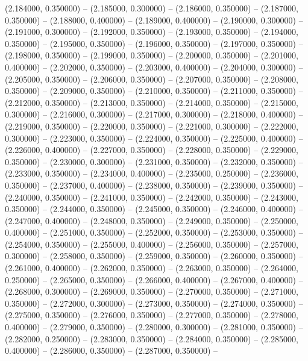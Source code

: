 (2.184000, 0.350000) -- 
(2.185000, 0.300000) -- 
(2.186000, 0.350000) -- 
(2.187000, 0.350000) -- 
(2.188000, 0.400000) -- 
(2.189000, 0.400000) -- 
(2.190000, 0.300000) -- 
(2.191000, 0.300000) -- 
(2.192000, 0.350000) -- 
(2.193000, 0.350000) -- 
(2.194000, 0.350000) -- 
(2.195000, 0.350000) -- 
(2.196000, 0.350000) -- 
(2.197000, 0.350000) -- 
(2.198000, 0.350000) -- 
(2.199000, 0.350000) -- 
(2.200000, 0.350000) -- 
(2.201000, 0.400000) -- 
(2.202000, 0.350000) -- 
(2.203000, 0.400000) -- 
(2.204000, 0.300000) -- 
(2.205000, 0.350000) -- 
(2.206000, 0.350000) -- 
(2.207000, 0.350000) -- 
(2.208000, 0.350000) -- 
(2.209000, 0.350000) -- 
(2.210000, 0.350000) -- 
(2.211000, 0.350000) -- 
(2.212000, 0.350000) -- 
(2.213000, 0.350000) -- 
(2.214000, 0.350000) -- 
(2.215000, 0.300000) -- 
(2.216000, 0.300000) -- 
(2.217000, 0.300000) -- 
(2.218000, 0.400000) -- 
(2.219000, 0.350000) -- 
(2.220000, 0.350000) -- 
(2.221000, 0.300000) -- 
(2.222000, 0.300000) -- 
(2.223000, 0.350000) -- 
(2.224000, 0.350000) -- 
(2.225000, 0.400000) -- 
(2.226000, 0.400000) -- 
(2.227000, 0.350000) -- 
(2.228000, 0.350000) -- 
(2.229000, 0.350000) -- 
(2.230000, 0.300000) -- 
(2.231000, 0.350000) -- 
(2.232000, 0.350000) -- 
(2.233000, 0.350000) -- 
(2.234000, 0.400000) -- 
(2.235000, 0.250000) -- 
(2.236000, 0.350000) -- 
(2.237000, 0.400000) -- 
(2.238000, 0.350000) -- 
(2.239000, 0.350000) -- 
(2.240000, 0.350000) -- 
(2.241000, 0.350000) -- 
(2.242000, 0.350000) -- 
(2.243000, 0.350000) -- 
(2.244000, 0.350000) -- 
(2.245000, 0.350000) -- 
(2.246000, 0.400000) -- 
(2.247000, 0.400000) -- 
(2.248000, 0.350000) -- 
(2.249000, 0.350000) -- 
(2.250000, 0.400000) -- 
(2.251000, 0.350000) -- 
(2.252000, 0.350000) -- 
(2.253000, 0.350000) -- 
(2.254000, 0.350000) -- 
(2.255000, 0.400000) -- 
(2.256000, 0.350000) -- 
(2.257000, 0.300000) -- 
(2.258000, 0.350000) -- 
(2.259000, 0.350000) -- 
(2.260000, 0.350000) -- 
(2.261000, 0.400000) -- 
(2.262000, 0.350000) -- 
(2.263000, 0.350000) -- 
(2.264000, 0.250000) -- 
(2.265000, 0.350000) -- 
(2.266000, 0.400000) -- 
(2.267000, 0.400000) -- 
(2.268000, 0.300000) -- 
(2.269000, 0.350000) -- 
(2.270000, 0.350000) -- 
(2.271000, 0.350000) -- 
(2.272000, 0.300000) -- 
(2.273000, 0.350000) -- 
(2.274000, 0.350000) -- 
(2.275000, 0.350000) -- 
(2.276000, 0.350000) -- 
(2.277000, 0.350000) -- 
(2.278000, 0.400000) -- 
(2.279000, 0.350000) -- 
(2.280000, 0.300000) -- 
(2.281000, 0.350000) -- 
(2.282000, 0.250000) -- 
(2.283000, 0.350000) -- 
(2.284000, 0.350000) -- 
(2.285000, 0.400000) -- 
(2.286000, 0.350000) -- 
(2.287000, 0.350000) -- 
